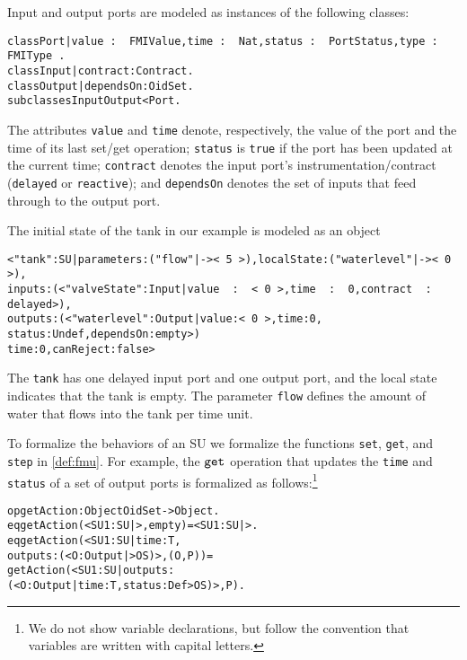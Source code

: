 Input and output ports are modeled as  instances of the following
classes:

\small
\begin{alltt}
class Port | value\,:\,\,FMIValue, time\,:\,\,Nat, status\,:\,\,PortStatus, type\,:\,\,FMIType\,. 
class Input | contract : Contract .
class Output | dependsOn : OidSet .     
subclasses Input Output < Port .
\end{alltt}
\normalsize

\noindent The attributes \texttt{value} and \texttt{time} denote, respectively, the
value of the port and the time of its last set/get operation; 
\texttt{status} is \texttt{true}  if the port has been
updated  at the current time;   \texttt{contract} denotes the
input port's instrumentation/contract (\texttt{delayed} or
\texttt{reactive}); and 
\texttt{dependsOn} denotes the set of inputs that feed
through to the output port. 

\begin{example}
The initial state of the tank in our  example is modeled as an object
  
\scriptsize
\begin{alltt}
< "tank" : SU | parameters : ("flow" |-> <\,5\,>),  localState : ("waterlevel" |-> <\,0\,>),
                inputs : (< "valveState" : Input | value\,\,:\,\,<\,0\,>, time\,\,:\,\,0, contract\,\,:\,\,delayed >),
                outputs : (< "waterlevel" : Output | value : <\,0\,>, time : 0,
                                                     status : Undef, dependsOn : empty >)
                time : 0,  canReject : false >
\end{alltt}
\normalsize

\noindent The \texttt{tank} has one delayed input port and one output
port, and the local state indicates that the tank  is empty.  
The parameter \texttt{flow} defines the amount of  water that  flows
into the tank per time unit.
\end{example}

To formalize the behaviors of an SU we formalize the functions
\texttt{set}, \texttt{get}, and \texttt{step} in
\cref{def:fmu}. 
For example, the $\mathtt{get}_{}$ operation that updates the \texttt{time}
and \texttt{status}  of a set
of output ports is formalized as follows:\footnote{We do not show
  variable declarations, but follow the convention that variables are
  written with capital letters.} 

\small
\begin{alltt}
  op getAction : Object OidSet -> Object .
  eq getAction(< SU1 : SU | >, empty) = < SU1 : SU | > .
  eq getAction(< SU1 : SU | time : T, 
                            outputs : (< O : Output | > OS) >, (O , P)) = 
     getAction(< SU1 : SU | outputs : 
                     (< O : Output | time : T, status : Def > OS) >, P) .
\end{alltt}
\normalsize

